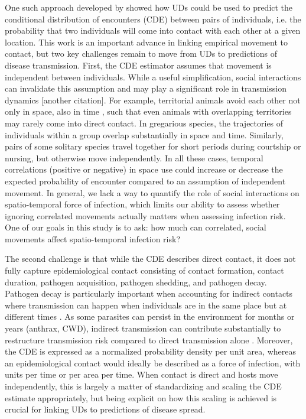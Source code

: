 \documentclass[letterpaper]{article}
\begin{document}

One such approach developed by \citet{Noonan2021} showed how UDs could be used to predict the conditional distribution of encounters (CDE) between pairs of individuals, i.e. the probability that two individuals will come into contact with each other at a given location.
This work is an important advance in linking empirical movement to contact, but two key challenges remain to move from UDs to predictions of disease transmission.  
First, the CDE estimator assumes that movement is independent between individuals.
While a useful simplification, social interactions can invalidate this assumption and may play a significant role in transmission dynamics \citep{Manlove2018} [another citation]. For example, territorial animals avoid each other not only in space, also in time \citep{Giuggioli2013}, such that even  animals with overlapping territories may rarely come into direct contact.  In gregarious species, the trajectories of individuals within a group overlap substantially in space and time. Similarly, pairs of some solitary species travel together for short periods during courtship or nursing, but otherwise move independently. In all these cases, temporal correlations (positive or negative) in space use could increase or decrease the expected probability of encounter compared to an assumption of independent movement. In general, we lack a way to quantify the role of social interactions on spatio-temporal force of infection, which limits our ability to assess whether ignoring correlated movements actually matters when assessing infection risk. One of our goals in this study is to ask: how much can correlated, social movements affect spatio-temporal infection risk?


The second challenge is that while the CDE describes direct contact, it does not fully capture epidemiological contact consisting of contact formation, contact duration, pathogen acquisition, pathogen shedding, and pathogen decay. Pathogen decay is particularly important when accounting for indirect contacts where transmission can happen when individuals are in the same place but at different times \citep{Wilber2022,Yang2023,Richardson2015}.  As some parasites can persist in the environment for months or years (anthrax, CWD), indirect transmission can contribute substantially to restructure transmission risk compared to direct transmission alone \citep{Yang2023}.  Moreover, the CDE is expressed as a normalized probability density per unit area, whereas an epidemiological contact would ideally be described as a force of infection, with units per time or per area per time.  When contact is direct and hosts move independently, this is largely a matter of standardizing and scaling the CDE estimate appropriately, but being explicit on how this scaling is achieved is crucial for linking UDs to predictions of disease spread.
\end{document}
